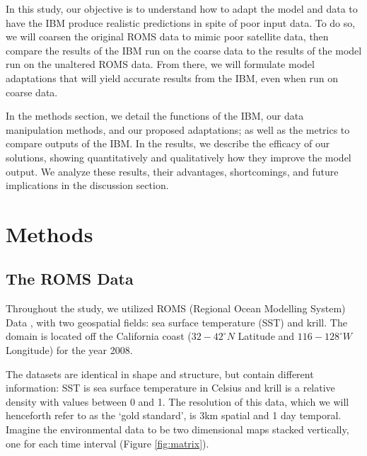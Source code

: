 \documentclass[11pt]{article}
\begin{document}
In this study, our objective is to understand how to adapt the model and data to have the IBM produce realistic predictions in spite of poor input data. To do so, we will coarsen the original ROMS data to mimic poor satellite data, then compare the results of the IBM run on the coarse data to the results of the model run on the unaltered ROMS data. From there, we will formulate model adaptations that will yield accurate results from the IBM, even when run on coarse data. \par

In the methods section, we detail the functions of the IBM, our data manipulation methods, and our proposed adaptations; as well as the metrics to compare outputs of the IBM. In the results, we describe the efficacy of our solutions, showing quantitatively and qualitatively how they improve the model output. We analyze these results, their advantages, shortcomings, and future implications in the discussion section. \par

\section{Methods}
\subsection{The ROMS Data}
Throughout the study, we utilized ROMS (Regional Ocean Modelling System) Data \cite{ROMS1} \cite{ROMS2}, with two geospatial fields: sea surface temperature (SST) and krill. The domain is located off the California coast ($32 - 42^{\circ}N$ Latitude and $116-128^{\circ}W$ Longitude) for the year 2008. \par 

The datasets are identical in shape and structure, but contain different information: SST is sea surface temperature in Celsius and krill is a relative density with values between 0 and 1.
The resolution of this data, which we will henceforth refer to as the ‘gold standard’, is 3km spatial and 1 day temporal. Imagine the environmental data to be two dimensional maps stacked vertically, one for each time interval (Figure \ref{fig:matrix}). \par
\end{document}
